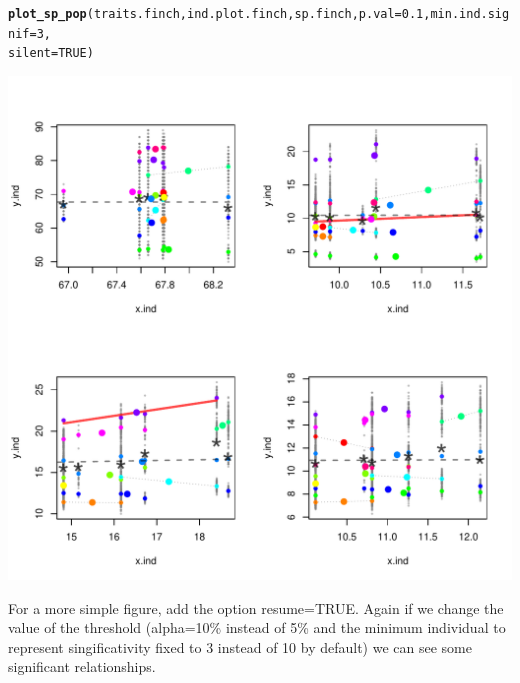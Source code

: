 \documentclass[12pt]{article}\usepackage[]{graphicx}\usepackage[]{color}
\makeatletter
\def\maxwidth{ %
  \ifdim\Gin@nat@width>\linewidth
    \linewidth
  \else
    \Gin@nat@width
  \fi
}
\newcommand{\hlnum}[1]{\textcolor[rgb]{0.686,0.059,0.569}{#1}}%
\newcommand{\hlstd}[1]{\textcolor[rgb]{0.345,0.345,0.345}{#1}}%
\newcommand{\hlkwc}[1]{\textcolor[rgb]{0.333,0.667,0.333}{#1}}%
\newcommand{\hlkwd}[1]{\textcolor[rgb]{0.737,0.353,0.396}{\textbf{#1}}}%
\newenvironment{kframe}{%
 \def\at@end@of@kframe{}%
 \ifinner\ifhmode%
  \def\at@end@of@kframe{\end{minipage}}%
  \begin{minipage}{\columnwidth}%
 \fi\fi%
 \def\FrameCommand##1{\hskip\@totalleftmargin \hskip-\fboxsep
 \colorbox{shadecolor}{##1}\hskip-\fboxsep
     \hskip-\linewidth \hskip-\@totalleftmargin \hskip\columnwidth}%
 \MakeFramed {\advance\hsize-\width
   \@totalleftmargin\z@ \linewidth\hsize
   \@setminipage}}%
 {\par\unskip\endMakeFramed%
 \at@end@of@kframe}
\newenvironment{knitrout}{}{} %
\makeatother
\begin{document}
\begin{knitrout}
\color{fgcolor}\begin{kframe}
\begin{alltt}
\hlkwd{plot_sp_pop}\hlstd{(traits.finch, ind.plot.finch, sp.finch,} \hlkwc{p.val} \hlstd{=} \hlnum{0.1}\hlstd{,} \hlkwc{min.ind.signif} \hlstd{=} \hlnum{3}\hlstd{,}
    \hlkwc{silent} \hlstd{=} \hlnum{TRUE}\hlstd{)}
\end{alltt}
\end{kframe}
\includegraphics[width=\maxwidth]{figure/unnamed-chunk-18} 

\end{knitrout}


\newpage

For a more simple figure, add the option resume=TRUE. Again if we change the value of the threshold (alpha=10\% instead of 5\% and the minimum individual to represent singificativity fixed to 3 instead of 10 by default) we can see some significant relationships.
\end{document}
